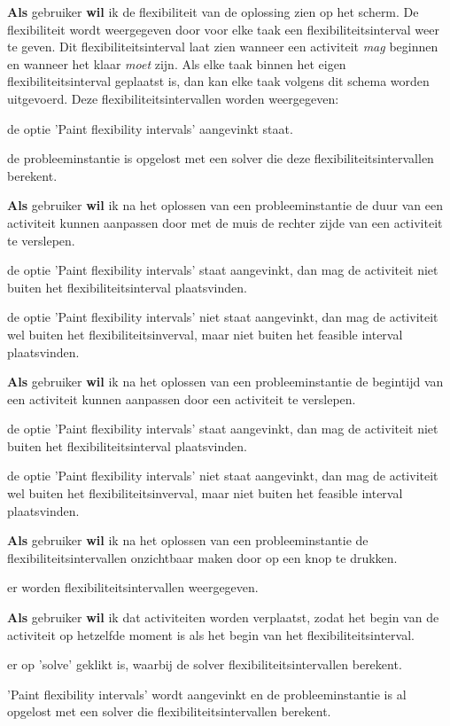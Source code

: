 \nextUserStory
\textbf{Als} gebruiker \textbf{wil} ik de flexibiliteit van de oplossing zien op het scherm. De flexibiliteit wordt weergegeven door voor elke taak een flexibiliteitsinterval weer te geven. Dit flexibiliteitsinterval laat zien wanneer een activiteit \emph{mag} beginnen en wanneer het klaar \emph{moet} zijn. Als elke taak binnen het eigen flexibiliteitsinterval geplaatst is, dan kan elke taak volgens dit schema worden uitgevoerd. Deze flexibiliteitsintervallen worden weergegeven:
\beginGegeven
    \item de optie 'Paint flexibility intervals' aangevinkt staat.
    \item de probleeminstantie is opgelost met een solver die deze flexibiliteitsintervallen berekent. 
\endGegeven

\nextUserStory
\textbf{Als} gebruiker \textbf{wil} ik na het oplossen van een probleeminstantie de duur van een activiteit kunnen aanpassen door met de muis de rechter zijde van een activiteit te verslepen. 
\beginAls
    \item de optie 'Paint flexibility intervals' staat aangevinkt, dan mag de activiteit niet buiten het flexibiliteitsinterval plaatsvinden. 
    \item de optie 'Paint flexibility intervals' niet staat aangevinkt, dan mag de activiteit wel buiten het flexibiliteitsinverval, maar niet buiten het feasible interval plaatsvinden. 
\endAls

\nextUserStory 
\textbf{Als} gebruiker \textbf{wil} ik na het oplossen van een probleeminstantie de begintijd van een activiteit kunnen aanpassen door een activiteit te verslepen.
\beginAls
    \item de optie 'Paint flexibility intervals' staat aangevinkt, dan mag de activiteit niet buiten het flexibiliteitsinterval plaatsvinden. 
    \item de optie 'Paint flexibility intervals' niet staat aangevinkt, dan mag de activiteit wel buiten het flexibiliteitsinverval, maar niet buiten het feasible interval plaatsvinden. 
\endAls

\nextUserStory
\textbf{Als} gebruiker \textbf{wil} ik na het oplossen van een probleeminstantie de flexibiliteitsintervallen onzichtbaar maken door op een knop te drukken.
\beginGegeven
    \item er worden flexibiliteitsintervallen weergegeven.
\endGegeven

\nextUserStory
\textbf{Als} gebruiker \textbf{wil} ik dat activiteiten worden verplaatst, zodat het begin van de activiteit op hetzelfde moment is als het begin van het flexibiliteitsinterval. 
\beginAls
    \item er op 'solve' geklikt is, waarbij de solver flexibiliteitsintervallen berekent.
    \item 'Paint flexibility intervals' wordt aangevinkt en de probleeminstantie is al opgelost met een solver die flexibiliteitsintervallen berekent. 
\endAls

